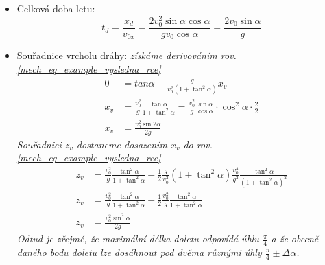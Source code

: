 \begin{example}
\begin{itemize}
            \item Celková doba letu:
              \begin{equation}\label{mech:eq_doba_letu}
                t_d=\frac{x_d}{v_{0x}} =\frac{2v_0^2\sin\alpha\cos\alpha}{gv_0\cos\alpha}
                   =\frac{2v_0\sin\alpha}{g}
              \end{equation}

            \item Souřadnice vrcholu dráhy: \emph{získáme derivováním rov.
                  \ref{mech_eq_example_vysledna_rce}}
                  \begin{align}
                    0   &= tan\alpha-\frac{g}{v_0^2(1+\tan^2\alpha)}x_v                         \\
                    x_v &= \frac{v_0^2}{g}\frac{\tan\alpha}{1+\tan^2\alpha}=
                           \frac{v_0^2}{g}\frac{\sin\alpha}{\cos\alpha}
                           \cdot\cos^2\alpha\cdot\frac{2}{2}                                   \\
                    x_v &= \frac{v_0^2\sin{2\alpha}}{2g}
                   \end{align}
                   \emph{Souřadnici $z_v$ dostaneme dosazením $x_v$  do rov.
                   \ref{mech_eq_example_vysledna_rce}}
                   \begin{align}
                     z_v &= \frac{v_0^2}{g}\frac{\tan^2\alpha}{1+\tan^2\alpha}-
                            \frac{1}{2}\frac{g}{v_0^2}(1+\tan^2\alpha)\frac{v_0^4}{g^2}
                            \frac{\tan^2\alpha}{(1+\tan^2\alpha)^2}                            \\
                     z_v &= \frac{v_0^2}{g}\frac{\tan^2\alpha}{1+\tan^2\alpha}-
                            \frac{1}{2}\frac{v_0^2}{g}\frac{\tan^2\alpha}{1+\tan^2\alpha}      \\
                     z_v &= \frac{v_0^2\sin^2\alpha}{2g}
              \end{align}
              \emph{Odtud je zřejmé, že maximální délka doletu odpovídá úhlu $\frac{\pi}{4}$ a že
              obecně daného bodu doletu lze dosáhnout pod dvěma různými úhly
              $\frac{\pi}{4}\pm\Delta\alpha$.}


\end{itemize}
\end{example}
